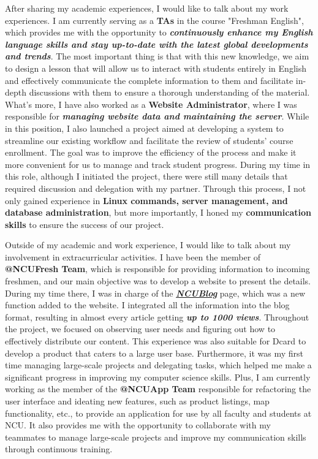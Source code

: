 After sharing my academic experiences, I would like to talk about my work experiences.
I am currently serving as a \textbf{TAs} in the course "Freshman English", which provides me with the opportunity to \textbf{\textit{continuously enhance my English language skills and stay up-to-date with the latest global developments and trends}}. The most important thing is that with this new knowledge, we aim to design a lesson that will allow us to interact with students entirely in English and effectively communicate the complete information to them and facilitate in-depth discussions with them to ensure a thorough understanding of the material. 
What's more, I have also worked as a \textbf{Website Administrator}, where I was responsible for \textbf{\textit{managing website data and maintaining the server}}. While in this position, 
I also launched a project aimed at developing a system to streamline our existing workflow and facilitate the review of students' course enrollment. The goal was to improve the efficiency of the process and make it more convenient for us to manage and track student progress. 
During my time in this role, although I initiated the project, there were still many details that required discussion and delegation with my partner. Through this process, I not only gained experience in\textbf{ Linux commands, server management, and database administration}, but more importantly, I honed my \textbf{communication skills} to ensure the success of our project.

Outside of my academic and work experience, I would like to talk about my involvement in extracurricular activities. I have been the member of \textbf{@NCUFresh Team}, which is responsible for providing information to incoming freshmen, and our main objective was to develop a website to present the details. During my time there, I was in charge of the \textbf{\textit{\href{https://ncufresh22tmp.le37.tw/blog/}{NCUBlog}}} page, which was a new function added to the website. I integrated all the information into the blog format, resulting in almost every article getting \textit{\textbf{up to 1000 views}}. Throughout the project, we focused on observing user needs and figuring out how to effectively distribute our content. This experience was also suitable for Dcard to develop a product that caters to a large user base. Furthermore, it was my first time managing large-scale projects and delegating tasks, which helped me make a significant progress in improving my computer science skills. Plus, I am currently working as the member of the \textbf{@NCUApp Team} responsible for refactoring the user interface and ideating new features, such as product listings, map functionality, etc., to provide an application for use by all faculty and students at NCU. It also provides me with the opportunity to collaborate with my teammates to manage large-scale projects and improve my communication skills through continuous training.

